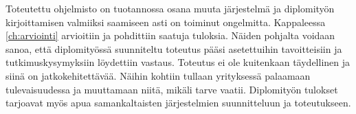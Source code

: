 Toteutettu ohjelmisto on tuotannossa osana muuta järjestelmä ja diplomityön kirjoittamisen valmiiksi saamiseen asti on toiminut ongelmitta. Kappaleessa \ref{ch:arviointi} arvioitiin ja pohdittiin saatuja tuloksia. Näiden pohjalta voidaan sanoa, että diplomityössä suunniteltu toteutus pääsi asetettuihin tavoitteisiin ja tutkimuskysymyksiin löydettiin vastaus. Toteutus ei ole kuitenkaan täydellinen ja siinä on jatkokehitettävää. Näihin kohtiin tullaan yrityksessä palaamaan tulevaisuudessa ja muuttamaan niitä, mikäli tarve vaatii. Diplomityön tulokset tarjoavat myös apua samankaltaisten järjestelmien suunnitteluun ja toteutukseen.